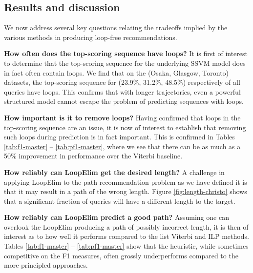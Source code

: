 %
\subsection{Results and discussion}

We now address several key questions relating the tradeoffs implied by the various methods in producing loop-free recommendations.

\textbf{How often does the top-scoring sequence have loops?}
It is first of interest to determine that the top-scoring sequence for the underlying SSVM model does in fact often contain loops.
We find that on the (Osaka, Glasgow, Toronto) datasets, the top-scoring sequence for (23.9\%, 31.2\%, 48.5\%) respectively of all queries have loops.
This confirms that with longer trajectories, even a powerful structured model cannot escape the problem of predicting sequences with loops.


\textbf{How important is it to remove loops?}
Having confirmed that loops in the top-scoring sequence are an issue,
it is now of interest to establish that removing such loops during prediction is in fact important.
This is confirmed in Tables \ref{tab:f1-master} -- \ref{tab:pf1-master},
where we see that there can be as much as a 50\% improvement in performance over the {\sc Viterbi} baseline.

\textbf{How reliably can {\sc LoopElim} get the desired length?}
A challenge in applying {\sc LoopElim} to the path recommendation problem as we have defined it
is that it may result in a path of the wrong length.
Figure \ref{fig:length-christo} shows that a significant fraction of queries will have a different length to the target.

\textbf{How reliably can {\sc LoopElim} predict a good path?}
Assuming one can overlook the {\sc LoopElim} producing a path of possibly incorrect length,
it is then of interest as to how well it performs compared to the list Viterbi and ILP methods.
Tables \ref{tab:f1-master} -- \ref{tab:pf1-master} show that the heuristic, while sometimes competitive on the F1 measures, often
grossly underperforms compared to the more principled approaches.


